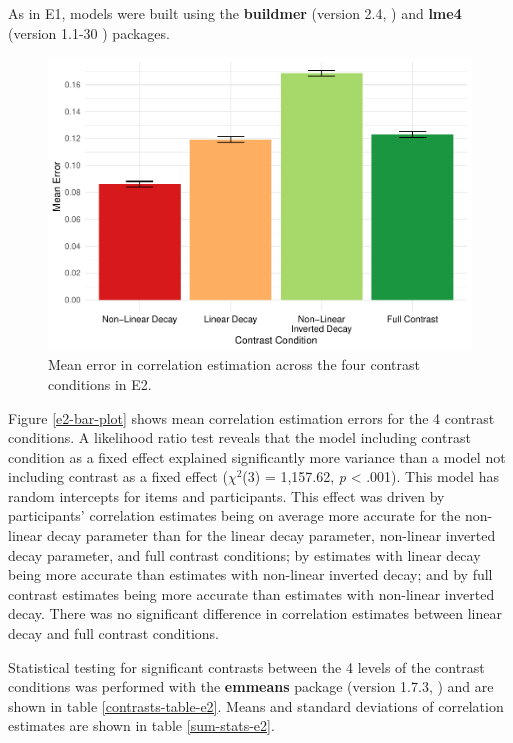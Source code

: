 \documentclass[preprint, 3p,
authoryear]{elsarticle} %
\begin{document}
As in E1, models were built using the \textbf{buildmer} (version 2.4,
\citep{voeten_buildmer_2022}) and \textbf{lme4} (version 1.1-30
\citep{bates_lme4_2015}) packages.

\begin{figure}

\includegraphics[width=0.5\linewidth]{contrast_and_scatterplots_files/figure-latex/e2-bar-plot-1} \hfill{}

\caption{\label{e2-bar-plot}Mean error in correlation estimation across the four contrast conditions in E2.}\label{fig:e2-bar-plot}
\end{figure}

Figure \ref{e2-bar-plot} shows mean correlation estimation errors for
the 4 contrast conditions. A likelihood ratio test reveals that the
model including contrast condition as a fixed effect explained
significantly more variance than a model not including contrast as a
fixed effect (\(\chi^2\)(3) = 1,157.62, \emph{p} \textless{} .001). This
model has random intercepts for items and participants. This effect was
driven by participants' correlation estimates being on average more
accurate for the non-linear decay parameter than for the linear decay
parameter, non-linear inverted decay parameter, and full contrast
conditions; by estimates with linear decay being more accurate than
estimates with non-linear inverted decay; and by full contrast estimates
being more accurate than estimates with non-linear inverted decay. There
was no significant difference in correlation estimates between linear
decay and full contrast conditions.

Statistical testing for significant contrasts between the 4 levels of
the contrast conditions was performed with the \textbf{emmeans} package
(version 1.7.3, \citep{emmeans}) and are shown in table
\ref{contrasts-table-e2}. Means and standard deviations of correlation
estimates are shown in table \ref{sum-stats-e2}.
\end{document}
